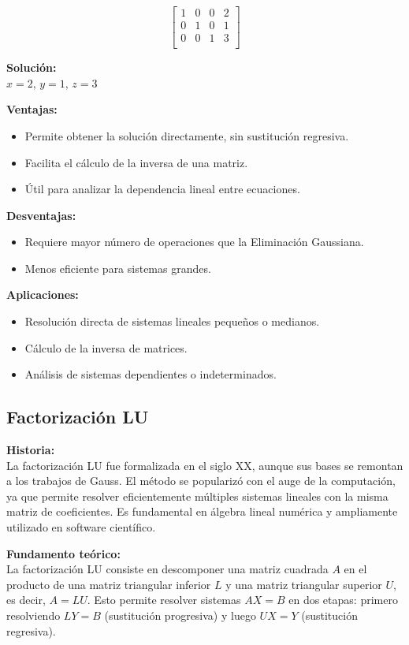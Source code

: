 \documentclass[12pt]{article}
\begin{document}
\[
\left[
\begin{array}{ccc|c}
1 & 0 & 0 & 2 \\
0 & 1 & 0 & 1 \\
0 & 0 & 1 & 3 \\
\end{array}
\right]
\]

\textbf{Solución:}  \\
$x = 2$, $y = 1$, $z = 3$

\textbf{Ventajas:}
\begin{itemize}
    \item Permite obtener la solución directamente, sin sustitución regresiva.
    \item Facilita el cálculo de la inversa de una matriz.
    \item Útil para analizar la dependencia lineal entre ecuaciones.
\end{itemize}

\textbf{Desventajas:}
\begin{itemize}
    \item Requiere mayor número de operaciones que la Eliminación Gaussiana.
    \item Menos eficiente para sistemas grandes.
\end{itemize}

\textbf{Aplicaciones:}
\begin{itemize}
    \item Resolución directa de sistemas lineales pequeños o medianos.
    \item Cálculo de la inversa de matrices.
    \item Análisis de sistemas dependientes o indeterminados.
\end{itemize}

\subsection{Factorización LU}

\textbf{Historia:}  \\
La factorización LU fue formalizada en el siglo XX, aunque sus bases se remontan a los trabajos de Gauss. El método se popularizó con el auge de la computación, ya que permite resolver eficientemente múltiples sistemas lineales con la misma matriz de coeficientes. Es fundamental en álgebra lineal numérica y ampliamente utilizado en software científico.

\textbf{Fundamento teórico:}  \\
La factorización LU consiste en descomponer una matriz cuadrada $A$ en el producto de una matriz triangular inferior $L$ y una matriz triangular superior $U$, es decir, $A = LU$. Esto permite resolver sistemas $AX = B$ en dos etapas: primero resolviendo $LY = B$ (sustitución progresiva) y luego $UX = Y$ (sustitución regresiva).
\end{document}
